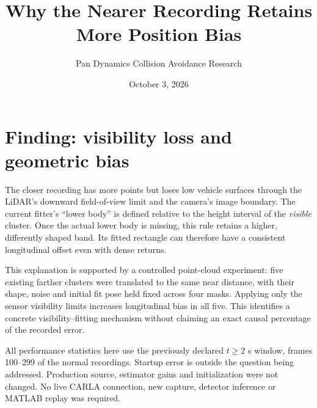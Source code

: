 \documentclass[11pt]{article}
\title{Why the Nearer Recording Retains More Position Bias}
\author{Pan Dynamics Collision Avoidance Research}
\date{October 3, 2026}
\begin{document}
\maketitle

\section{Finding: visibility loss and geometric bias}
The closer recording has more points but loses low vehicle surfaces through
the LiDAR's downward field-of-view limit and the camera's image boundary.
The current fitter's ``lower body'' is defined relative to the height interval
of the \emph{visible} cluster. Once the actual lower body is missing, this
rule retains a higher, differently shaped band. Its fitted rectangle can
therefore have a consistent longitudinal offset even with dense returns.

This explanation is supported by a controlled point-cloud experiment:
five existing farther clusters were translated to the same near distance,
with their shape, noise and initial fit pose held fixed across four masks.
Applying only the sensor visibility limits increases longitudinal bias in
all five. This identifies a concrete visibility--fitting mechanism without
claiming an exact causal percentage of the recorded error.

All performance statistics here use the previously declared $t\geq2$ s
window, frames 100--299 of the normal recordings. Startup error is outside
the question being addressed. Production source, estimator gains and
initialization were not changed. No live CARLA connection, new capture,
detector inference or MATLAB replay was required.
\end{document}
